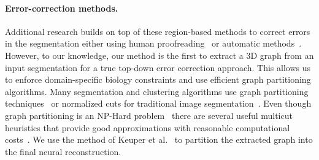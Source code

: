 \paragraph{Error-correction methods.}
Additional research builds on top of these region-based methods to correct errors in the segmentation either using human proofreading~\cite{haehn2014design,haehn2017guided,mojo2} or automatic methods~\cite{rolnick2017morphological,error_correction_using_CNN}.
However, to our knowledge, our method is the first to extract a 3D graph from an input segmentation for a true top-down error correction approach. 
This allows us to enforce domain-specific biology constraints and use efficient graph partitioning algorithms. 
Many segmentation and clustering algorithms use graph partitioning techniques~\cite{andres2012globally} or normalized cuts for traditional image segmentation~\cite{kappes2016higher,shi2000normalized,tatiraju2008image}.
Even though graph partitioning is an NP-Hard problem~\cite{demaine2006correlation} there are several useful multicut heuristics that provide good approximations with reasonable computational costs~\cite{horvnakova2017analysis}. 
We use the method of Keuper et al.~\cite{keuper2015efficient} to partition the extracted graph into the final neural reconstruction.

